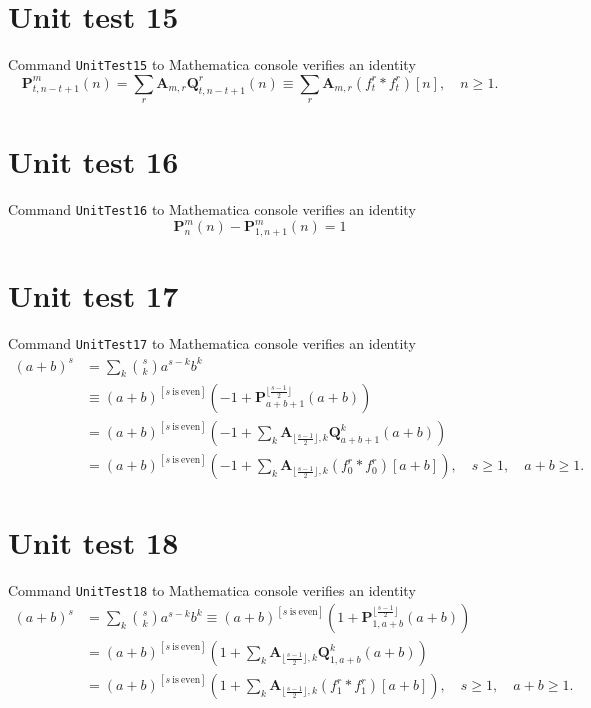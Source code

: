 \documentclass[12pt, letterpaper]{amsart}
\theoremstyle{definition}
\theoremstyle{remark}
\numberwithin{equation}{section}
\begin{document}
\section*{Unit test 15}
Command \verb"UnitTest15" to Mathematica console verifies an identity
\begin{equation*}
\mathbf{P}^{m}_{t,n-t+1}(n)
=\sum\limits_{r}\mathbf{A}_{m,r} \mathbf{Q}_{t,n-t+1}^r(n)
\equiv \sum\limits_{r}\mathbf{A}_{m,r} (f_{t}^{r} \ast f_{t}^{r})[n], \quad n\geq 1.
\end{equation*}
\section*{Unit test 16}
Command \verb"UnitTest16" to Mathematica console verifies an identity
\begin{equation*}
\mathbf{P}^{m}_{n}(n) - \mathbf{P}^{m}_{1,n+1}(n) = 1
\end{equation*}
\section*{Unit test 17}
Command \verb"UnitTest17" to Mathematica console verifies an identity
\begin{equation*}
\begin{split}
(a+b)^s
&=\sum_{k} \binom{s}{k} a^{s-k} b^k \\
&\equiv(a+b)^{[s \ \mathrm{is} \ \mathrm{even}]} \left(-1 + \mathbf{P}^{\lfloor \tfrac{s-1}{2} \rfloor}_{a+b+1}(a+b)\right) \\
&=(a+b)^{[s \ \mathrm{is} \ \mathrm{even}]} \left(-1 + \sum_{k}^{ \ }\mathbf{A}_{\lfloor \tfrac{s-1}{2} \rfloor, k}\mathbf{Q}^{k}_{a+b+1}(a+b)\right) \\
&=(a+b)^{[s \ \mathrm{is} \ \mathrm{even}]} \left(-1 + \sum_{k}^{ \ }\mathbf{A}_{\lfloor \tfrac{s-1}{2} \rfloor, k}(f^{r}_{0} \ast f^{r}_{0})[a+b]\right), \quad s\geq 1, \quad a+b\geq 1.
\end{split}
\end{equation*}
\section*{Unit test 18}
Command \verb"UnitTest18" to Mathematica console verifies an identity
\begin{equation*}
\begin{split}
(a+b)^s
&=\sum_{k} \binom{s}{k} a^{s-k} b^k
\equiv(a+b)^{[s \ \mathrm{is} \ \mathrm{even}]} \left(1 + \mathbf{P}^{\lfloor \tfrac{s-1}{2} \rfloor}_{1,a+b}(a+b)\right) \\
&=(a+b)^{[s \ \mathrm{is} \ \mathrm{even}]} \left(1 + \sum_{k}^{ \ }\mathbf{A}_{\lfloor \tfrac{s-1}{2} \rfloor, k}\mathbf{Q}^{k}_{1,a+b}(a+b)\right) \\
&=(a+b)^{[s \ \mathrm{is} \ \mathrm{even}]} \left(1 + \sum_{k}^{ \ }\mathbf{A}_{\lfloor \tfrac{s-1}{2} \rfloor, k}(f^{r}_{1} \ast f^{r}_{1})[a+b]\right), \quad s\geq 1, \quad a+b\geq 1.
\end{split}
\end{equation*}
\end{document}
